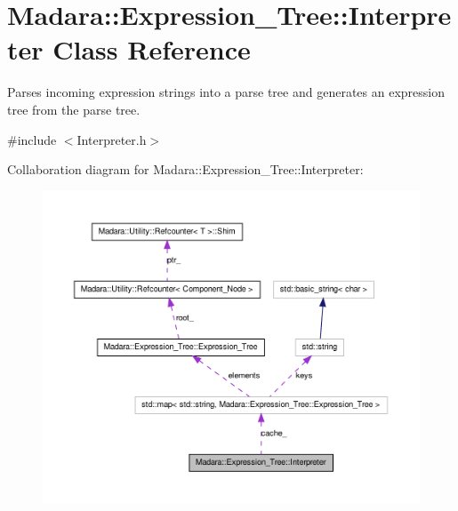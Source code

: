 \hypertarget{classMadara_1_1Expression__Tree_1_1Interpreter}{
\section{Madara::Expression\_\-Tree::Interpreter Class Reference}
\label{d9/d97/classMadara_1_1Expression__Tree_1_1Interpreter}
}


Parses incoming expression strings into a parse tree and generates an expression tree from the parse tree.  




{\ttfamily \#include $<$Interpreter.h$>$}



Collaboration diagram for Madara::Expression\_\-Tree::Interpreter:
\nopagebreak
\begin{figure}[H]
\begin{center}
\leavevmode
\includegraphics[width=400pt]{dc/da0/classMadara_1_1Expression__Tree_1_1Interpreter__coll__graph}
\end{center}
\end{figure}
